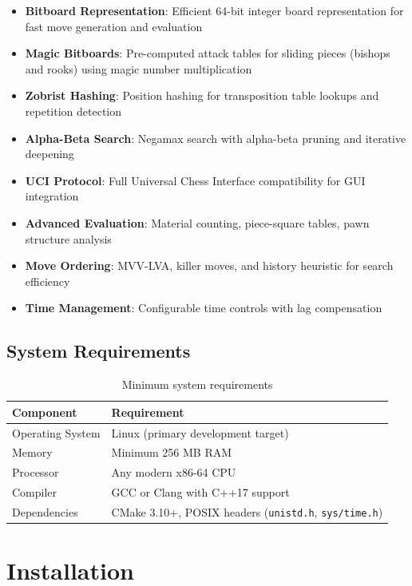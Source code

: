 \documentclass[11pt,a4paper]{report}
\begin{document}
\begin{itemize}
    \item \textbf{Bitboard Representation}: Efficient 64-bit integer board representation for fast move generation and evaluation
    \item \textbf{Magic Bitboards}: Pre-computed attack tables for sliding pieces (bishops and rooks) using magic number multiplication
    \item \textbf{Zobrist Hashing}: Position hashing for transposition table lookups and repetition detection
    \item \textbf{Alpha-Beta Search}: Negamax search with alpha-beta pruning and iterative deepening
    \item \textbf{UCI Protocol}: Full Universal Chess Interface compatibility for GUI integration
    \item \textbf{Advanced Evaluation}: Material counting, piece-square tables, pawn structure analysis
    \item \textbf{Move Ordering}: MVV-LVA, killer moves, and history heuristic for search efficiency
    \item \textbf{Time Management}: Configurable time controls with lag compensation
\end{itemize}

\section{System Requirements}

\begin{table}[h]
\centering
\begin{tabular}{ll}
\toprule
\textbf{Component} & \textbf{Requirement} \\
\midrule
Operating System & Linux (primary development target) \\
Memory & Minimum 256 MB RAM \\
Processor & Any modern x86-64 CPU \\
Compiler & GCC or Clang with C++17 support \\
Dependencies & CMake 3.10+, POSIX headers (\texttt{unistd.h}, \texttt{sys/time.h}) \\
\bottomrule
\end{tabular}
\caption{Minimum system requirements}
\end{table}

\chapter{Installation}
\end{document}
